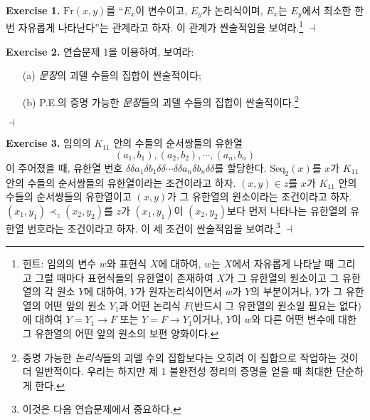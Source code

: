 \documentclass[12pt]{paper}
\newenvironment{context}[1][]
{ \noindent \textbf{{#1}.} }
{ \hfill $ \dashv $ }
\begin{document}
\begin{context}[Exercise 1]
$\mathrm{Fr} \left( x , y \right)$를 ``$E_x$이 변수이고, $E_y$가 논리식이며, $E_x$는 $E_y$에서 최소한 한 번 자유롭게 나타난다''는 관계라고 하자.
이 관계가 싼술적임을 보여라.\footnote
{
힌트: 임의의 변수 $w$와 표현식 $X$에 대하여,
$w$는 $X$에서 자유롭게 나타날 때 그리고 그럴 때마다
표현식들의 유한열이 존재하여 $X$가 그 유한열의 원소이고 그 유한열의 각 원소 $Y$에 대하여,
$Y$가 원자논리식이면서 $w$가 $Y$의 부분이거나,
$Y$가 그 유한열의 어떤 앞의 원소 $Y_1$과 어떤 논리식 $F$(반드시 그 유한열의 원소일 필요는 없다)에 대하여 $Y = Y_1 \rightarrow F$ 또는 $Y = F \rightarrow Y_1$이거나,
$Y$이 $w$와 다른 어떤 변수에 대한 그 유한열의 어떤 앞의 원소의 보편 양화이다.
}
\end{context}

\begin{context}[Exercise 2]
연습문제 1을 이용하여, 보여라:
\begin{enumerate}
\item[(a)] \textit{문장}의 괴델 수들의 집합이 싼술적이다;
\item[(b)] P.E.의 증명 가능한 \textit{문장}들의 괴델 수들의 집합이 싼술적이다.\footnote
{
증명 가능한 \textit{논리식}들의 괴델 수의 집합보다는 오히려 이 집합으로 작업하는 것이 더 일반적이다.
우리는 하지만 제 1 불완전성 정리의 증명을 얻을 때 최대한 단순하게 한다.
}
\end{enumerate}
\end{context}

\begin{context}[Exercise 3]
임의의 $K_{11}$ 안의 수들의 순서쌍들의 유한열 $$\left( a_1 , b_1 \right) , \left( a_2 , b_2 \right) , \cdots , \left( a_n , b_n \right)$$이 주어졌을 때,
유한열 번호 $\delta \delta a_1 \delta b_1 \delta\delta \cdots \delta \delta a_n \delta b_n \delta \delta$를 할당한다.
$\mathrm{Seq}_2 \left( x \right)$를 $x$가 $K_{11}$ 안의 수들의 순서쌍들의 유한열이라는 조건이라고 하자.
$ \left( x , y \right) \in z $를 $x$가 $K_{11}$ 안의 수들의 순서쌍들의 유한열이고
$ \left( x , y \right) $가 그 유한열의 원소이라는 조건이라고 하자.
$ \left( x_1 , y_1 \right) \prec_{z} \left( x_2 , y_2 \right) $를
$z$가 $\left( x_1 , y_1 \right)$이 $\left( x_2 , y_2 \right)$보다
먼저 나타나는 유한열의 유한열 번호라는 조건이라고 하자.
이 세 조건이 싼술적임을 보여라.\footnote
{
이것은 다음 연습문제에서 중요하다.
}
\end{context}
\end{document}
